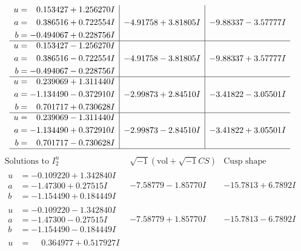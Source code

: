 \documentclass[1p]{elsarticle_modified}
\theoremstyle{definition}
\newcommand{\I}{\sqrt{-1}}
\begin{document}
$$\begin{array}{c|c|c}
\begin{aligned}
u &= \phantom{-}0.153427 + 1.256270 I \\
a &= \phantom{-}0.386516 + 0.722554 I \\
b &= -0.494067 + 0.228756 I\end{aligned}
 & -4.91758 + 3.81805 I & -9.88337 - 3.57777 I \\ \hline\begin{aligned}
u &= \phantom{-}0.153427 - 1.256270 I \\
a &= \phantom{-}0.386516 - 0.722554 I \\
b &= -0.494067 - 0.228756 I\end{aligned}
 & -4.91758 - 3.81805 I & -9.88337 + 3.57777 I \\ \hline\begin{aligned}
u &= \phantom{-}0.239069 + 1.311440 I \\
a &= -1.134490 - 0.372910 I \\
b &= \phantom{-}0.701717 + 0.730628 I\end{aligned}
 & -2.99873 + 2.84510 I & -3.41822 - 3.05501 I \\ \hline\begin{aligned}
u &= \phantom{-}0.239069 - 1.311440 I \\
a &= -1.134490 + 0.372910 I \\
b &= \phantom{-}0.701717 - 0.730628 I\end{aligned}
 & -2.99873 - 2.84510 I & -3.41822 + 3.05501 I\\
 \hline 
 \end{array}$$\newpage$$\begin{array}{c|c|c}  
\text{Solutions to }I^u_{2}& \I (\text{vol} + \sqrt{-1}CS) & \text{Cusp shape}\\
 \hline 
\begin{aligned}
u &= -0.109220 + 1.342840 I \\
a &= -1.47300 + 0.27515 I \\
b &= -1.154490 + 0.184449 I\end{aligned}
 & -7.58779 - 1.85770 I & -15.7813 + 6.7892 I \\ \hline\begin{aligned}
u &= -0.109220 - 1.342840 I \\
a &= -1.47300 - 0.27515 I \\
b &= -1.154490 - 0.184449 I\end{aligned}
 & -7.58779 + 1.85770 I & -15.7813 - 6.7892 I \\ \hline\begin{aligned}
u &= \phantom{-}0.364977 + 0.517927 I \\

\end{aligned}
\end{array}$$
\end{document}
